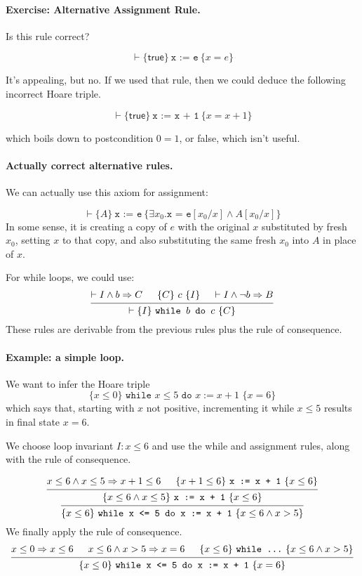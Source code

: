 \documentclass[11pt]{article}
\begin{document}
\paragraph{Exercise: Alternative Assignment Rule.} Is this rule correct?

\[ \vdash \{ \mathsf{true} \}~ \texttt{x := e} ~ \{ x = e \} \]

It's appealing, but no. If we used that rule, then we could deduce the following incorrect
Hoare triple.

\[ \vdash \{ \mathsf{true} \}~ \texttt{x := x + 1} ~ \{ x = x + 1 \} \]

which boils down to postcondition $0 = 1$, or \textsf{false}, which isn't useful.

\paragraph{Actually correct alternative rules.} We can actually use this axiom for assignment:

\[
\vdash \{ A \}~ \texttt{x := e} ~ \{ \exists x_0. \texttt{x = e}[x_0/x] \wedge A[x_0/x] \} \]
In some sense, it is creating a copy of $e$ with the original $x$ substituted by fresh $x_0$, setting $x$ to that copy, and
also substituting the same fresh $x_0$ into $A$ in place of $x$.

For while loops, we could use:
\[
\begin{prooftree}
\hypo{\vdash I \wedge b \Rightarrow C}
\hypo{\{ C \} ~c~ \{ I \}}
\hypo{\vdash I \wedge \neg b \Rightarrow B}
\infer3{\vdash \{I\} ~\texttt{while $b$ do $c$}~\{C\}}
\end{prooftree}
\]
These rules are derivable from the previous rules plus the rule of consequence.

\paragraph{Example: a simple loop.}
We want to infer the Hoare triple
\[ \{ x \leq 0 \} \texttt{~while $x \leq 5$ do $x := x + 1$~}  \{ x=6\} \]
which says that, starting with $x$ not positive, incrementing it while $x \leq 5$ results in final state $x = 6$.

We choose loop invariant $I: x \leq 6$ and use the while and assignment rules, along with the rule of consequence.

\[
\begin{prooftree}
  \hypo{x \leq 6 \wedge x \leq 5 \Rightarrow x + 1 \leq 6}
  \hypo{\{ x+1 \leq 6 \} ~\texttt{x := x + 1}~ \{ x \leq 6 \}}
  \infer2{\{ x \leq 6 \wedge x \leq 5\} ~\texttt{x := x + 1}~ \{ x \leq 6 \}}
  \infer1{\{ x \leq 6\} ~\texttt{while x <= 5 do x := x + 1}~ \{ x \leq 6 \wedge x > 5 \}}
\end{prooftree}
\]
We finally apply the rule of consequence.
\[
\begin{prooftree}
  \hypo{x \leq 0 \Rightarrow x \leq 6}
  \hypo{x \leq 6 \wedge x > 5 \Rightarrow x = 6}
  \hypo{\{x \leq 6\} ~\texttt{while \ldots}~ \{ x \leq 6 \wedge x > 5\} }
  \infer3{\{x \leq 0\} ~\texttt{while x <= 5 do x := x + 1}~\{ x = 6 \}}
\end{prooftree}
\]
\end{document}
